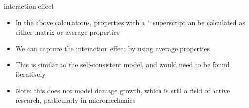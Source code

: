 \documentclass[
  letterpaper,
  ignorenonframetext,
  aspectratio=43,
  handout,
  12pt]{beamer}
\providecommand{\tightlist}{%
  \setlength{\itemsep}{0pt}\setlength{\parskip}{0pt}}
\providecommand{\tightlist}{%
\setlength{\itemsep}{0pt}\setlength{\parskip}{0pt}}
\begin{document}
\begin{frame}{interaction effect}
\protect\hypertarget{interaction-effect}{}
\begin{itemize}
\tightlist
\item
  In the above calculations, properties with a * superscript an be
  calculated as either matrix or average properties
\item
  We can capture the interaction effect by using average properties
\item
  This is similar to the self-consistent model, and would need to be
  found iteratively
\item
  Note: this does not model damage growth, which is still a field of
  active research, particularly in micromechanics
\end{itemize}
\end{frame}
\end{document}

